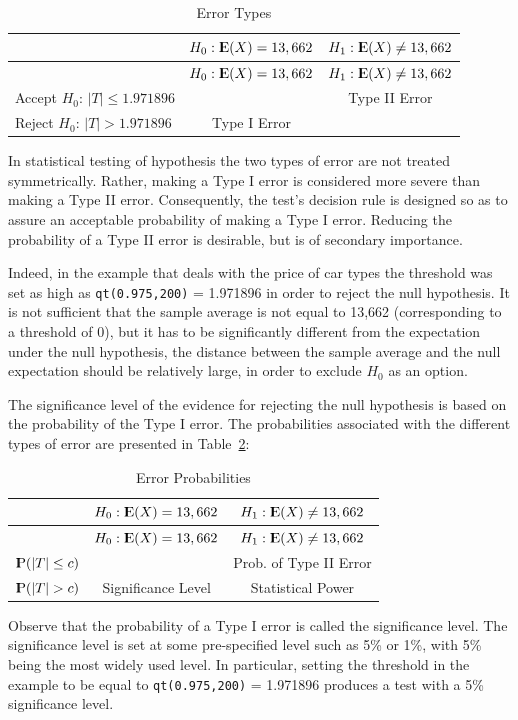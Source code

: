 \documentclass[]{krantz}
\newcommand{\Expec}{{\rm I\kern-.3em E}}
\newcommand{\Prob}{{\rm I\kern-.3em P}}
\theoremstyle{definition}
\theoremstyle{definition}
\theoremstyle{definition}
\theoremstyle{remark}
\begin{document}
\begin{longtable}[]{@{}lcc@{}}
\caption{\label{tab:Testing1}Error Types{}}\tabularnewline
\toprule
& \(H_0: \Expec(X) = 13,662\) &
\(H_1:\Expec(X) \not= 13,662\)\tabularnewline
\midrule
\endfirsthead
\toprule
& \(H_0: \Expec(X) = 13,662\) &
\(H_1:\Expec(X) \not= 13,662\)\tabularnewline
\midrule
\endhead
Accept \(H_0\): \(|T| \leq 1.971896\) & & Type II Error\tabularnewline
Reject \(H_0\): \(|T| > 1.971896\) & Type I Error &\tabularnewline
\bottomrule
\end{longtable}

In statistical testing of hypothesis the two types of error are not
treated symmetrically. Rather, making a Type I error is considered more
severe than making a Type II error. Consequently, the test's decision
rule is designed so as to assure an acceptable probability of making a
Type I error. Reducing the probability of a Type II error is desirable,
but is of secondary importance.

Indeed, in the example that deals with the price of car types the
threshold was set as high as \texttt{qt(0.975,200)} = 1.971896 in order
to reject the null hypothesis. It is not sufficient that the sample
average is not equal to 13,662 (corresponding to a threshold of 0), but
it has to be significantly different from the expectation under the null
hypothesis, the distance between the sample average and the null
expectation should be relatively large, in order to exclude \(H_0\) as
an option.

The significance level of the evidence for rejecting the null hypothesis
is based on the probability of the Type I error. The probabilities
associated with the different types of error are presented in
Table~\ref{tab:Testing2}:

\begin{longtable}[]{@{}lcc@{}}
\caption{\label{tab:Testing2}Error Probabilities{}}\tabularnewline
\toprule
& \(H_0: \Expec(X) = 13,662\) &
\(H_1:\Expec(X) \not= 13,662\)\tabularnewline
\midrule
\endfirsthead
\toprule
& \(H_0: \Expec(X) = 13,662\) &
\(H_1:\Expec(X) \not= 13,662\)\tabularnewline
\midrule
\endhead
\(\Prob(|T| \leq c)\) & & Prob. of Type II Error\tabularnewline
\(\Prob(|T| > c)\) & Significance Level & Statistical
Power\tabularnewline
\bottomrule
\end{longtable}

Observe that the probability of a Type I error is called the
significance level. The significance level is set at some pre-specified
level such as 5\% or 1\%, with 5\% being the most widely used level. In
particular, setting the threshold in the example to be equal to
\texttt{qt(0.975,200)} = 1.971896 produces a test with a 5\%
significance level.
\end{document}
